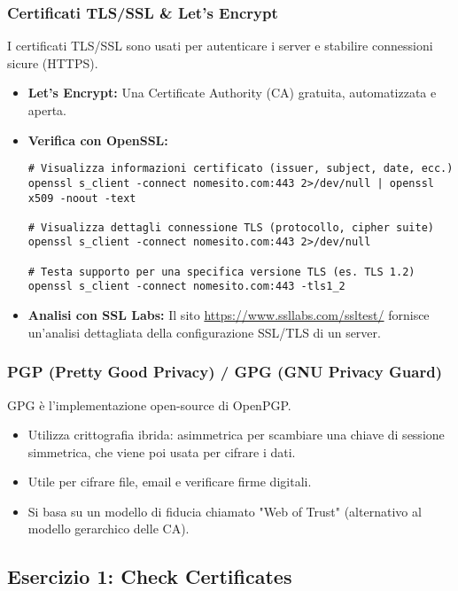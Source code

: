 \subsubsection{Certificati TLS/SSL \& Let's Encrypt}
I certificati TLS/SSL sono usati per autenticare i server e stabilire connessioni sicure (HTTPS).
\begin{itemize}
    \item \textbf{Let's Encrypt:} Una Certificate Authority (CA) gratuita, automatizzata e aperta.
    \item \textbf{Verifica con OpenSSL:}
    \begin{verbatim}
# Visualizza informazioni certificato (issuer, subject, date, ecc.)
openssl s_client -connect nomesito.com:443 2>/dev/null | openssl x509 -noout -text

# Visualizza dettagli connessione TLS (protocollo, cipher suite)
openssl s_client -connect nomesito.com:443 2>/dev/null

# Testa supporto per una specifica versione TLS (es. TLS 1.2)
openssl s_client -connect nomesito.com:443 -tls1_2
    \end{verbatim}
    \item \textbf{Analisi con SSL Labs:} Il sito \url{https://www.ssllabs.com/ssltest/} fornisce un'analisi dettagliata della configurazione SSL/TLS di un server.
\end{itemize}

\subsubsection{PGP (Pretty Good Privacy) / GPG (GNU Privacy Guard)}
GPG è l'implementazione open-source di OpenPGP.
\begin{itemize}
    \item Utilizza crittografia ibrida: asimmetrica per scambiare una chiave di sessione simmetrica, che viene poi usata per cifrare i dati.
    \item Utile per cifrare file, email e verificare firme digitali.
    \item Si basa su un modello di fiducia chiamato "Web of Trust" (alternativo al modello gerarchico delle CA).
\end{itemize}

\subsection{Esercizio 1: Check Certificates}
